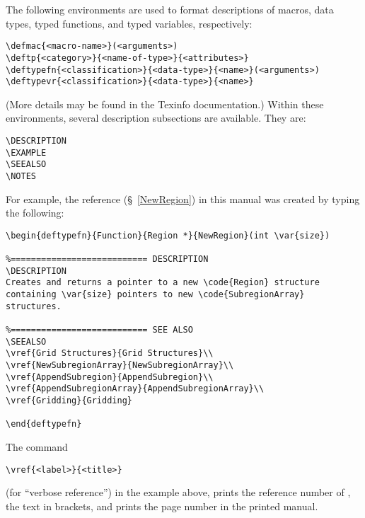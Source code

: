 The following environments are used to format descriptions of macros,
data types, typed functions, and typed variables, respectively:
\begin{display}\begin{verbatim}
\defmac{<macro-name>}(<arguments>)
\deftp{<category>}{<name-of-type>}{<attributes>}
\deftypefn{<classification>}{<data-type>}{<name>}(<arguments>)
\deftypevr{<classification>}{<data-type>}{<name>}
\end{verbatim}\end{display}
(More details may be found in the Texinfo documentation.)
Within these  environments, several description
subsections are available.
They are:
\begin{display}\begin{verbatim}
\DESCRIPTION
\EXAMPLE
\SEEALSO
\NOTES
\end{verbatim}\end{display}
For example, the  reference (\S~\ref{NewRegion})
in this manual was created by typing the following:
\begin{display}\begin{verbatim}
\begin{deftypefn}{Function}{Region *}{NewRegion}(int \var{size})

%=========================== DESCRIPTION
\DESCRIPTION
Creates and returns a pointer to a new \code{Region} structure
containing \var{size} pointers to new \code{SubregionArray} structures.

%=========================== SEE ALSO
\SEEALSO
\vref{Grid Structures}{Grid Structures}\\
\vref{NewSubregionArray}{NewSubregionArray}\\
\vref{AppendSubregion}{AppendSubregion}\\
\vref{AppendSubregionArray}{AppendSubregionArray}\\
\vref{Gridding}{Gridding}

\end{deftypefn}
\end{verbatim}\end{display}
The command
\begin{display}\begin{verbatim}
\vref{<label>}{<title>}
\end{verbatim}\end{display}
(for ``verbose reference'') in the example above, prints the reference
number of , the  text in brackets, and
prints the page number in the printed manual.

